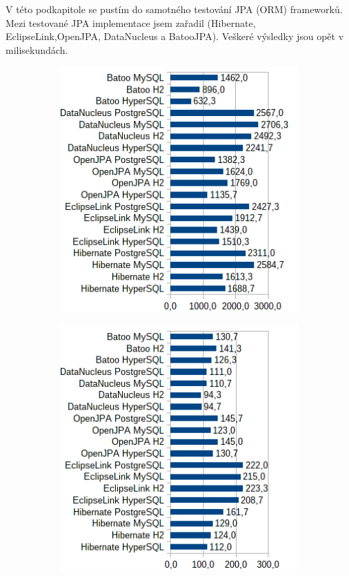 V této podkapitole se pustím do samotného testování JPA (ORM) frameworků. Mezi testované JPA implementace jsem zařadil (Hibernate, EclipseLink,OpenJPA, DataNucleus a BatooJPA).
Veškeré výsledky jsou opět v milisekundách.

\begin{figure}[!h]
\begin{subfigure}[b]{1\textwidth}
\includegraphics[width=25em]{obr/bench/jpa1}
\end{subfigure}
\begin{subfigure}[b]{1\textwidth}
\includegraphics[width=25em]{obr/bench/jpa2}
\end{subfigure}
\end{figure}

